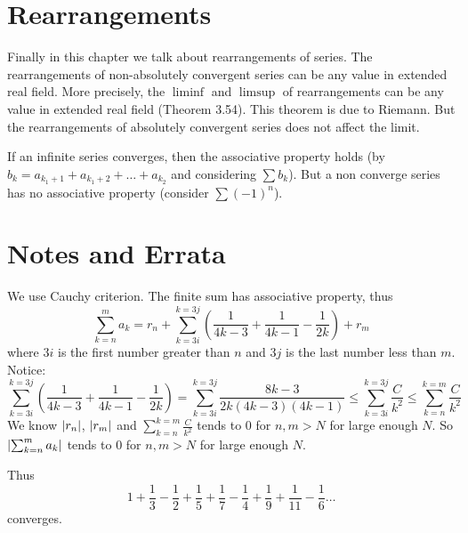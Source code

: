 \section{Rearrangements}
Finally in this chapter we talk about rearrangements of series. The rearrangements of non-absolutely convergent series can be any value in extended real field. More precisely, the $\liminf$ and $\limsup$ of rearrangements can be any value in extended real field (Theorem 3.54). This theorem is due to Riemann. But the rearrangements of absolutely convergent series does not affect the limit.\par
If an infinite series converges, then the associative property holds (by $b_k=a_{k_1+1}+a_{k_1+2}+\dots+a_{k_2}$ and considering $\sum b_k$). But a non converge series has no associative property (consider $\sum (-1)^n$).
\section{Notes and Errata}
\begin{note}
    We use Cauchy criterion. The finite sum has associative property, thus 
    \begin{equation*}
        \sum_{k=n}^m a_k= r_n+\sum_{k=3i}^{k=3j}(\frac{1}{4k-3}+\frac{1}{4k-1}-\frac{1}{2k})+r_m
    \end{equation*}
    where $3i$ is the first number greater than $n$ and $3j$ is the last number less than $m$.
    Notice:
    \begin{equation*}
        \sum_{k=3i}^{k=3j}(\frac{1}{4k-3}+\frac{1}{4k-1}-\frac{1}{2k})=\sum_{k=3i}^{k=3j}\frac{8k-3}{2k(4k-3)(4k-1)}\leq\sum_{k=3i}^{k=3j}\frac{C}{k^2}\leq\sum_{k=n}^{k=m}\frac{C}{k^2}
    \end{equation*}
    We know $\left\lvert r_n\right\rvert$, $\left\lvert r_m\right\rvert$ and $\sum_{k=n}^{k=m}\frac{C}{k^2}$ tends to 0 for $n,m>N$ for large enough $N$. So $\left\lvert\sum_{k=n}^m a_k\right\rvert$ tends to 0 for $n,m>N$ for large enough $N$. \par 
    Thus 
    \begin{equation*}
        1+\frac{1}{3}-\frac{1}{2}+\frac{1}{5}+\frac{1}{7}-\frac{1}{4}+\frac{1}{9}+\frac{1}{11}-\frac{1}{6}\dots
    \end{equation*}
    converges.
\end{note}
